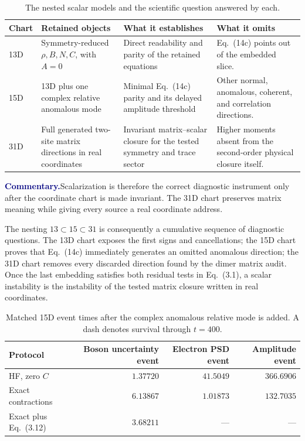 \documentclass[10pt]{article}
\newcommand{\pedbox}[2]{%
  \par\medskip
  \noindent\colorbox{pale}{%
    \parbox{\dimexpr\linewidth-2\fboxsep\relax}{%
      \textcolor{navy}{\textbf{#1}}\quad #2%
    }%
  }\par\medskip
}
\newcommand{\commentarybox}[1]{\pedbox{Commentary.}{#1}}
\begin{document}
\begin{table}[t]
\centering
\caption{The nested scalar models and the scientific question answered by
each.}
\label{tab:closures}
\begin{tabularx}{0.94\textwidth}{@{}p{}p{}Y Y@{}}
\toprule
Chart & Retained objects & What it establishes & What it omits \\
\midrule
13D & Symmetry-reduced \(\rho,B,N,C\), with \(A=0\) &
Direct readability and parity of the retained equations &
Eq.~(14c) points out of the embedded slice.\\
15D & 13D plus one complex relative anomalous mode &
Minimal Eq.~(14c) parity and its delayed amplitude threshold &
Other normal, anomalous, coherent, and correlation directions.\\
31D & Full generated two-site matrix directions in real coordinates &
Invariant matrix--scalar closure for the tested symmetry and trace sector &
Higher moments absent from the second-order physical closure itself.\\
\bottomrule
\end{tabularx}
\end{table}

\commentarybox{Scalarization is therefore the correct diagnostic instrument
only after the coordinate chart is made invariant.  The 31D chart preserves
matrix meaning while giving every source a real coordinate address.}

The nesting \(13\subset15\subset31\) is consequently a cumulative sequence of
diagnostic questions.  The 13D chart exposes
the first signs and cancellations; the 15D chart proves that Eq.~(14c)
immediately generates an omitted anomalous direction; the 31D chart removes
every discarded direction found by the dimer matrix audit.  Once the last
embedding satisfies both residual tests in Eq.~(3.1), a scalar instability is
the instability of the tested matrix closure written in real coordinates.

\begin{table}[t]
\centering
\caption{Matched 15D event times after the complex anomalous relative mode is
added.  A dash denotes survival through \(t=400\).}
\label{tab:15devents}
\begin{tabularx}{0.86\textwidth}{@{}Yrrr@{}}
\toprule
Protocol & Boson uncertainty event & Electron PSD event & Amplitude event\\
\midrule
HF, zero \(C\) & \(1.37720\) & \(41.5049\) & \(366.6906\)\\
Exact contractions & \(6.13867\) & \(1.01873\) & \(132.7035\)\\
Exact plus Eq.~(3.12) & \(3.68211\) & --- & ---\\
\bottomrule
\end{tabularx}
\end{table}
\end{document}
